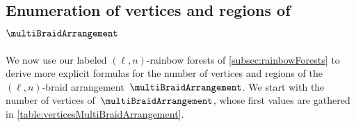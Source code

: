 \subsection{Enumeration of vertices and regions of $\multiBraidArrangement$}
\label{subsec:verticesFacetsMultiBraidArrangement}

We now use our labeled $(\ell,n)$-rainbow forests of \cref{subsec:rainbowForests} to derive more explicit formulas for the number of vertices and regions of the $(\ell,n)$-braid arrangement~$\multiBraidArrangement$.
We start with the number of vertices of~$\multiBraidArrangement$, whose first values are gathered in \cref{table:verticesMultiBraidArrangement}.

\begin{table}
	\centerline{}
	\vspace{.3cm}
	\caption{The numbers $f_0(\multiBraidArrangement) = \ell \big( (\ell-1) n + 1 \big)^{n-2}$ of vertices of~$\multiBraidArrangement$ for~$\ell,n \in [8]$.}
	\label{table:verticesMultiBraidArrangement}
\end{table}

